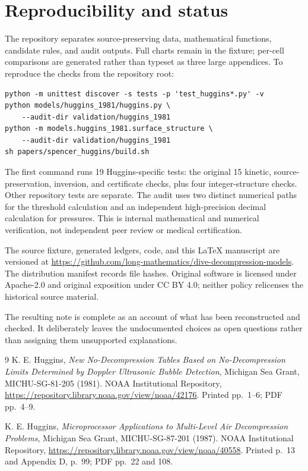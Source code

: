 \documentclass[11pt,letterpaper]{article}
\newcommand{\repo}{\url{https://github.com/long-mathematics/dive-decompression-models}}
\begin{document}
\section{Reproducibility and status}
The repository separates source-preserving data, mathematical functions, candidate rules, and audit outputs. Full charts remain in the fixture; per-cell comparisons are generated rather than typeset as three large appendices. To reproduce the checks from the repository root:
\begin{verbatim}
python -m unittest discover -s tests -p 'test_huggins*.py' -v
python models/huggins_1981/huggins.py \
    --audit-dir validation/huggins_1981
python -m models.huggins_1981.surface_structure \
    --audit-dir validation/huggins_1981
sh papers/spencer_huggins/build.sh
\end{verbatim}
The first command runs 19 Huggins-specific tests: the original 15 kinetic, source-preservation, inversion, and certificate checks, plus four integer-structure checks. Other repository tests are separate. The audit uses two distinct numerical paths for the threshold calculation and an independent high-precision decimal calculation for pressures. This is internal mathematical and numerical verification, not independent peer review or medical certification.

The source fixture, generated ledgers, code, and this LaTeX manuscript are versioned at \repo. The distribution manifest records file hashes. Original software is licensed under Apache-2.0 and original exposition under CC BY 4.0; neither policy relicenses the historical source material.

The resulting note is complete as an account of what has been reconstructed and checked. It deliberately leaves the undocumented choices as open questions rather than assigning them unsupported explanations.

\begin{thebibliography}{9}
K. E. Huggins,
\emph{New No-Decompression Tables Based on No-Decompression Limits Determined by Doppler Ultrasonic Bubble Detection},
Michigan Sea Grant, MICHU-SG-81-205 (1981).
NOAA Institutional Repository, \url{https://repository.library.noaa.gov/view/noaa/42176}.
Printed pp.~1--6; PDF pp.~4--9.

K. E. Huggins,
\emph{Microprocessor Applications to Multi-Level Air Decompression Problems},
Michigan Sea Grant, MICHU-SG-87-201 (1987).
NOAA Institutional Repository, \url{https://repository.library.noaa.gov/view/noaa/40558}.
Printed p.~13 and Appendix D, p.~99; PDF pp.~22 and 108.
\end{thebibliography}
\end{document}
